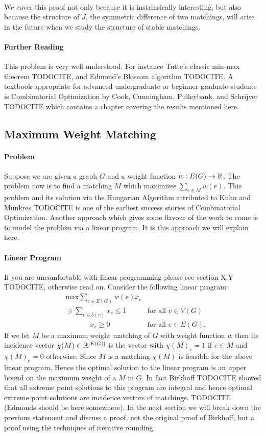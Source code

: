 \paragraph{}
We cover this proof not only because it is instrinsically interesting, but also because the structure of $J$, the symmetric difference of two matchings, will arise in the future when we study the structure of stable matchings.
\paragraph{Further Reading}
This problem is very well understood. For instance Tutte's classic min-max theorem TODOCITE, and Edmond's Blossom algorithm TODOCITE. A textbook appropriate for advanced undergraduate or beginner graduate students is Combinatorial Optimization by Cook, Cunningham, Pulleybank, and Schrijver TODOCITE which contains a chapter covering the results mentioned here.
\subsection{Maximum Weight Matching}
\paragraph{Problem} Suppose we are given a graph $G$ and a weight function $w : E(G) \rightarrow \mathbb{R}$. The problem now is to find a matching $M$ which maximizes $\sum_{e \in M} w(e)$. This problem and its solution via the Hungarian Algorithm attributed to Kuhn and Munkres TODOCITE is one of the earliest success stories of Combinatorial Optimization. Another approach which gives some flavour of the work to come is to model the problem via a linear program. It is this approach we will explain here.
\paragraph{Linear Program}
If you are uncomfortable with linear programming please see section X.Y TODOCITE, otherwise read on. Consider the following linear program:
\begin{align*}
	&\text{max} \sum_{e \in E(G)} w(e) x_e \\
	&\ni \sum_{e \in \delta(v)} x_e \leq 1 &\text{for all $v \in V(G)$} \\
	&\quad\quad\quad\ \ x_e \geq 0 &\text{for all $e \in E(G)$.}
\end{align*}
If we let $M$ be a maximum weight matching of $G$ with weight function $w$ then its incidence vector $\chi(M) \in \mathbb{R}^{|E(G)|}$ is the vector with $\chi(M)_e = 1$ if $e \in M$ and $\chi(M)_e = 0$ otherwise. Since $M$ is a matching $\chi(M)$ is feasible for the above linear program. Hence the optimal solution to the linear program is an upper bound on the maximum weight of a $M$ in $G$. In fact Birkhoff TODOCITE showed that all extreme point solutions to this program are integral and hence optimal extreme point solutions are incidence vectors of matchings. TODOCITE (Edmonds should be here somewhere). In the next section we will break down the previous statement and discuss a proof, not the original proof of Birkhoff, but a proof using the techniques of iterative rounding.
